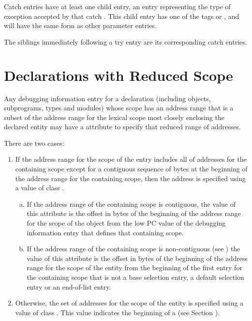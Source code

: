 Catch  entries have at least one child entry, 
an entry representing the type of exception accepted by
that catch . 
This child entry has one of the tags
\DWTAGformalparameter{}
or
\DWTAGunspecifiedparameters{},
and will have the same form as other parameter entries.

The siblings immediately following a try  
entry are its corresponding catch  entries.


\section{Declarations with Reduced Scope}
\label{declarationswithreducedscope}
\hypertarget{chap:DWATstartscopeofdeclaration}{}
Any debugging information entry for a declaration 
(including objects, subprograms, types and modules) whose scope 
has an address range that is a subset of the address range for 
the lexical scope most closely enclosing the declared entity 
may have a 
\DWATstartscopeDEFN{}
attribute to specify that reduced range of addresses. 

There are two cases:
\begin{enumerate}[1. ]
\item If the address range for the scope of the entry 
includes all of addresses for the containing scope except 
for a contiguous sequence of bytes at the beginning of the 
address range for the containing scope, then the address is 
specified using a value of class \CLASSconstant. 

\begin{enumerate}[a) ]
\item If the address
range of the containing scope is contiguous, the value of 
this attribute is the offset in bytes of the beginning of 
the address range for the scope of the object from the low 
PC value of the debugging information entry that defines
that containing scope. 
\item If the address range of the containing 
scope is non-contiguous 
(see )
the value of this attribute is the offset in bytes of the 
beginning of the address range for the scope of the entity 
from the beginning of the first  entry
for the containing scope that is not a base selection entry, 
a default selection entry or an end-of-list entry.
\end{enumerate}

\item Otherwise, the set of addresses for the scope of the 
entity is specified using a value of class \CLASSrangelistptr{}. 
This value indicates the beginning of a 
(see Section ).
\end{enumerate}

